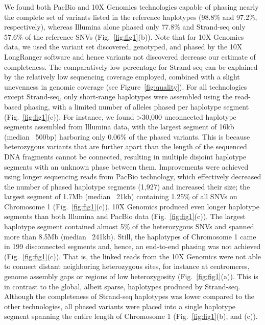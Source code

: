 	We found both PacBio and 10X Genomics technologies capable of phasing nearly the complete set of variants listed in the reference haplotypes (98.8\% and 97.2\%, respectively), 
	whereas Illumina alone phased only 77.8\% and Strand-seq only 57.6\% of the reference SNVs (Fig.~\ref{fig:fig1}(b)). 
	Note that for 10X Genomics data, we used the variant set discovered, genotyped, and phased by the 10X LongRanger software and hence variants not discovered decrease our estimate of completeness.
	The comparatively low percentage for Strand-seq can be explained by the relatively low sequencing coverage employed, combined with a slight unevenness in genomic coverage (see Figure~\ref{fig:quality}). 
	For all technologies except Strand-seq, only short-range haplotypes were assembled using the read-based phasing, with a limited number of alleles phased per haplotype segment (Fig.~\ref{fig:fig1}(c)). 
	For instance, we found >30,000 unconnected haplotype segments assembled from Illumina data, with the largest segment of 16kb (median ~500bp) harboring only 0.06\% of the phased variants. 
	This is because heterozygous variants that are further apart than the length of the sequenced DNA fragments cannot be connected, resulting in multiple disjoint haplotype segments with an unknown phase between them. 
	Improvements were achieved using longer sequencing reads from PacBio technology, which effectively decreased the number of phased haplotype segments (1,927) and increased their size; the largest segment of 1.7Mb (median ~21kb) 
	containing 1.25\% of all SNVs on Chromosome 1 (Fig.~\ref{fig:fig1}(c)). 10X Genomics produced even longer haplotype segments than both Illumina and PacBio data (Fig.~\ref{fig:fig1}(c)). 
	The largest haplotype segment contained almost 5\% of the heterozygous SNVs and spanned more than 8.5Mb (median ~241kb). Still, the haplotypes of Chromosome 1 came in 199 disconnected segments and, 
	hence, an end-to-end phasing was not achieved (Fig.~\ref{fig:fig1}(c)). That is, the linked reads from the 10X Genomics were not able to connect distant neighboring heterozygous sites, for instance at centromeres, 
	genome assembly gaps or regions of low heterozygosity (Fig.~\ref{fig:fig1}(a)). 
	This is in contrast to the global, albeit sparse, haplotypes produced by Strand-seq. 
	Although the completeness of Strand-seq haplotypes was lower compared to the other technologies, all phased variants were placed into a single haplotype segment spanning the entire length of Chromosome 1 (Fig.~\ref{fig:fig1}(b), and (c)).	
	
